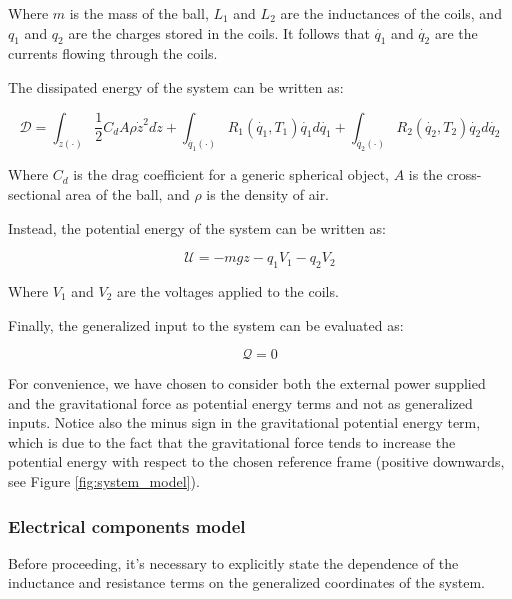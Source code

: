 Where $m$ is the mass of the ball, $L_1$ and $L_2$ are the inductances of the coils, and $q_1$ and $q_2$ are the charges stored in the coils.
It follows that $\dot{q_1}$ and $\dot{q_2}$ are the currents flowing through the coils.

The dissipated energy of the system can be written as:

\begin{equation}
    \mathcal{D} = \int_{\dot{z}(\cdot)} \frac{1}{2} C_d A \rho \dot{z}^2 d\dot{z} + \int_{\dot{q_1}(\cdot)} R_1(\dot{q_1}, T_1) \dot{q_1} d\dot{q_1} + \int_{\dot{q_2}(\cdot)} R_2(\dot{q_2}, T_2) \dot{q_2} d\dot{q_2}
    \label{eq:dissipated_energy}
\end{equation}

Where $C_d$ is the drag coefficient for a generic spherical object, $A$ is the cross-sectional area of the ball, and $\rho$ is the density of air.

Instead, the potential energy of the system can be written as:

\begin{equation}
    \mathcal{U} = -m g z - q_1 V_1 - q_2 V_2
    \label{eq:potential_energy}
\end{equation}

Where $V_1$ and $V_2$ are the voltages applied to the coils.

Finally, the generalized input to the system can be evaluated as:

\begin{equation}
    \mathcal{Q} = 0
    \label{eq:generalized_input}
\end{equation}

For convenience, we have chosen to consider both the external power supplied and the gravitational force as potential energy terms and not as generalized inputs.
Notice also the minus sign in the gravitational potential energy term, which is due to the fact that the gravitational force tends to increase the potential energy with respect to the chosen reference frame (positive downwards, see Figure \ref{fig:system_model}).



\subsubsection{Electrical components model}
\label{subsubsec:electrical_components_model}

Before proceeding, it's necessary to explicitly state the dependence of the inductance and resistance terms on the generalized coordinates of the system.

